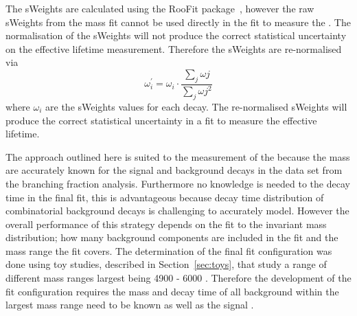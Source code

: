 The sWeights are calculated using the RooFit package~\cite{Verkerke:2003ir}, however the raw sWeights from the mass fit cannot be used directly in the \ml fit to measure the \el. The normalisation of the sWeights will not produce the correct statistical uncertainty on the effective lifetime measurement. Therefore the sWeights are re-normalised via
\begin{equation}
\omega^{'}_{i}= \omega_{i} \cdot \frac{\displaystyle\sum_{j} \omega{j}}{\displaystyle\sum_{j} \omega{j}^{2}}
\end{equation}
where $\omega_{i}$ are the sWeights values for each decay. The re-normalised sWeights will produce the correct statistical uncertainty in a \ml fit to measure the \bsmumu effective lifetime.

The approach outlined here is suited to the measurement of the \bsmumu \el because the mass \pdfs are accurately known for the signal and background decays in the data set from the branching fraction analysis. Furthermore no knowledge is needed to the decay time \pdfs in the final fit, this is advantageous because decay time distribution of combinatorial background decays is challenging to accurately model. 
However the overall performance of this strategy depends on the \ml fit to the invariant mass distribution; how many background components are included in the fit and the mass range the fit covers. The determination of the final fit configuration was done using toy studies, described in Section~\ref{sec:toys}, that study a range of different mass ranges largest being 4900 - 6000 \mevcc. Therefore the development of the fit configuration requires the mass and decay time \pdfs of all background within the largest mass range need to be known as well as the signal \pdfs. 




